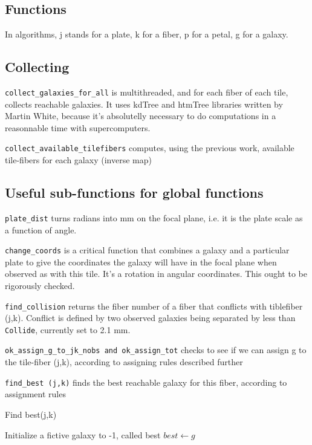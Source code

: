 \documentclass{extarticle}
\begin{document}
\begin{multicols}{2}

\section{Functions}
In algorithms, j stands for a plate, k for a fiber, p for a petal, g for a galaxy.

\subsection{Collecting}
{\tt collect\_galaxies\_for\_all} is multithreaded, and for each fiber of each tile, collects reachable galaxies. It uses kdTree and htmTree libraries written by Martin White, because it's absolutelly necessary to do computations in a reasonnable time with supercomputers.

{\tt collect\_available\_tilefibers} computes, using the previous work, available tile-fibers for each galaxy (inverse map)

\subsection{Useful sub-functions for global functions}
{\tt plate\_dist} turns radians into mm on the focal plane, i.e. it is the plate scale as a function of angle.

{\tt change\_coords} is a critical function that combines a galaxy and a particular plate to give the coordinates the galaxy will have in the focal plane when observed as with this tile. It's a rotation in angular coordinates. This ought to be rigorously checked.

{\tt find\_collision} returns the fiber number of a fiber that conflicts with tiblefiber (j,k).  Conflict is defined by two observed galaxies being separated by less than {\tt Collide}, currently set to 2.1 mm.

{\tt ok\_assign\_g\_to\_jk\_nobs and ok\_assign\_tot} checks to see if we can assign g to the tile-fiber (j,k), according to assigning rules described further

{\tt find\_best (j,k)} finds the best reachable galaxy for this fiber, according to assignment rules

\begin{algorithm}[H]
	\caption{Find best(j,k)}\label{euclid}
	\begin{algorithmic}[1]
		\State Initialize a fictive galaxy to -1, called best
		\State $best \gets g$
		\EndIf
		\EndFor
	\end{algorithmic}
\end{algorithm}


\end{multicols}
\end{document}
